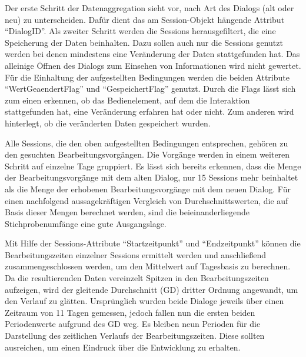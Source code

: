 Der erste Schritt der Datenaggregation sieht vor, nach Art des Dialogs (alt oder neu) zu unterscheiden. Dafür dient das am Session-Objekt hängende Attribut \enquote{DialogID}. Als zweiter Schritt werden die Sessions herausgefiltert, die eine Speicherung der Daten beinhalten. Dazu sollen auch nur die Sessions genutzt werden bei denen mindestens eine Veränderung der Daten stattgefunden hat. Das alleinige Öffnen des Dialogs zum Einsehen von Informationen wird nicht gewertet. Für die Einhaltung der aufgestellten Bedingungen werden die beiden Attribute \enquote{WertGeaendertFlag} und \enquote{GespeichertFlag} genutzt. Durch die Flags lässt sich zum einen erkennen, ob das Bedienelement, auf dem die Interaktion stattgefunden hat, eine Veränderung erfahren hat oder nicht. Zum anderen wird hinterlegt, ob die veränderten Daten gespeichert wurden.

Alle Sessions, die den oben aufgestellten Bedingungen entsprechen, gehören zu den gesuchten Bearbeitungsvorgängen. Die Vorgänge werden in einem weiteren Schritt auf einzelne Tage gruppiert. Es lässt sich bereits erkennen, dass die Menge der Bearbeitungsvorgänge mit dem alten Dialog, nur 15 Sessions mehr beinhaltet als die Menge der erhobenen Bearbeitungsvorgänge mit dem neuen Dialog. Für einen nachfolgend aussagekräftigen Vergleich von Durchschnittswerten, die auf Basis dieser Mengen berechnet werden, sind die beieinanderliegende Stichprobenumfänge eine gute Ausgangslage.

Mit Hilfe der Sessions-Attribute \enquote{Startzeitpunkt} und \enquote{Endzeitpunkt} können die Bearbeitungszeiten einzelner Sessions ermittelt werden und anschließend zusammengeschlossen werden, um den Mittelwert auf Tagesbasis zu berechnen. Da die resultierenden Daten vereinzelt Spitzen in den Bearbeitungszeiten aufzeigen, wird der gleitende Durchschnitt (GD) dritter Ordnung angewandt, um den Verlauf zu glätten. Ursprünglich wurden beide Dialoge jeweils über einen Zeitraum von 11 Tagen gemessen, jedoch fallen nun die ersten beiden Periodenwerte aufgrund des GD weg. Es bleiben neun Perioden für die Darstellung des zeitlichen Verlaufs der Bearbeitungszeiten. Diese sollten ausreichen, um einen Eindruck über die Entwicklung zu erhalten.

